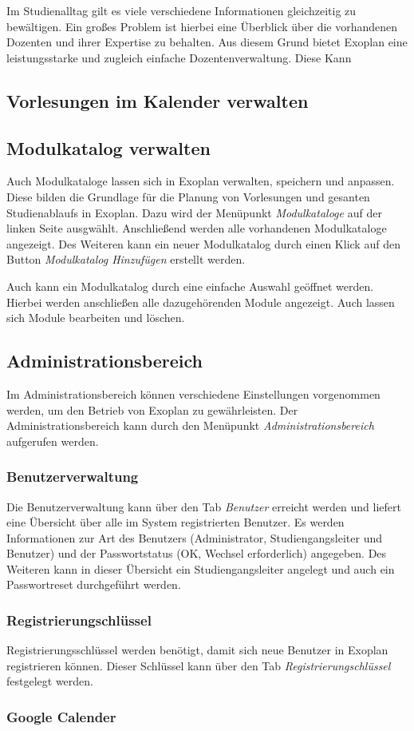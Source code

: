 Im Studienalltag gilt es viele verschiedene Informationen gleichzeitig zu bewältigen. Ein großes Problem ist hierbei eine Überblick über die vorhandenen Dozenten und ihrer Expertise zu behalten. Aus diesem Grund bietet Exoplan eine leistungsstarke und zugleich einfache Dozentenverwaltung. Diese Kann 

\subsection{Vorlesungen im Kalender verwalten}



\subsection{Modulkatalog verwalten}

Auch Modulkataloge lassen sich in Exoplan verwalten, speichern und anpassen. Diese bilden die Grundlage für die Planung von Vorlesungen und gesanten Studienablaufs in Exoplan. Dazu wird der Menüpunkt \textit{Modulkataloge} auf der linken Seite ausgwählt. Anschließend werden alle vorhandenen Modulkataloge angezeigt. Des Weiteren kann ein neuer Modulkatalog durch einen Klick auf den Button \textit{Modulkatalog Hinzufügen} erstellt werden. 

Auch kann ein Modulkatalog durch eine einfache Auswahl geöffnet werden. Hierbei werden anschließen alle dazugehörenden Module angezeigt. Auch lassen sich Module bearbeiten und löschen.

\subsection{Administrationsbereich}

Im Administrationsbereich können verschiedene Einstellungen vorgenommen werden, um den Betrieb von Exoplan zu gewährleisten. Der Administrationsbereich kann durch den Menüpunkt \textit{Administrationsbereich} aufgerufen werden.

\subsubsection{Benutzerverwaltung}

Die Benutzerverwaltung kann über den Tab \textit{Benutzer} erreicht werden und liefert eine Übersicht über alle im System registrierten Benutzer. Es werden Informationen zur Art des Benutzers (Administrator, Studiengangsleiter und Benutzer) und der Passwortstatus (OK, Wechsel erforderlich) angegeben. Des Weiteren kann in dieser Übersicht ein Studiengangsleiter angelegt und auch ein Passwortreset durchgeführt werden.

\subsubsection{Registrierungschlüssel}

Registrierungsschlüssel werden benötigt, damit sich neue Benutzer in Exoplan registrieren können. Dieser Schlüssel kann über den Tab \textit{Registrierungschlüssel} festgelegt werden.

\subsubsection{Google Calender}
